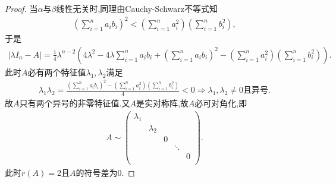 \documentclass[../../main.tex]{subfiles}
\begin{document}
\begin{proof}
当$\alpha$与$\beta$线性无关时,同理由Cauchy-Schwarz不等式知
\begin{align*}
\left( \sum\limits_{i=1}^n{a_ib_i} \right) ^2<\left( \sum\limits_{i=1}^n{a_{i}^{2}} \right) \left( \sum\limits_{i=1}^n{b_{i}^{2}} \right),
\end{align*}
于是
\begin{align*}
| \lambda I_n-A |=\frac{1}{4}\lambda ^{n-2}\left( 4\lambda ^2-4\lambda \sum\limits_{i=1}^n{a_ib_i}+\left( \sum\limits_{i=1}^n{a_ib_i} \right) ^2-\left( \sum\limits_{i=1}^n{a_{i}^{2}} \right) \left( \sum\limits_{i=1}^n{b_{i}^{2}} \right) \right).
\end{align*}
此时$A$必有两个特征值$\lambda _1,\lambda _2$满足
\begin{align*}
\lambda _1\lambda _2=\frac{\left( \sum\limits_{i=1}^n{a_ib_i} \right) ^2-\left( \sum\limits_{i=1}^n{a_{i}^{2}} \right) \left( \sum\limits_{i=1}^n{b_{i}^{2}} \right)}{4}<0\Longrightarrow \lambda _1,\lambda _2\ne 0\text{且异号}.
\end{align*}
故$A$只有两个异号的非零特征值.又$A$是实对称阵,故$A$必可对角化,即
\begin{align*}
A\sim \begin{pmatrix}
\lambda _1&		&		&		&		\\
&		\lambda _2&		&		&		\\
&		&		0&		&		\\
&		&		&		\ddots&		\\
&		&		&		&		0\\
\end{pmatrix}.
\end{align*}
此时$r( A ) =2$且$A$的符号差为$0.$

\end{proof}
\end{document}
